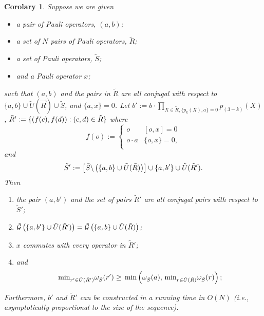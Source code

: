 \documentclass[twocolumn,showpacs,preprintnumbers,amsmath,amssymb,nofootinbib,pra,floatfix]{revtex4-1}
\newtheorem{corolary}{Corolary}
\newcommand{\lst}{\vec}
\newcommand{\set}{\tilde}
\newcommand{\genfun}{\tilde{\mathcal{G}}}
\begin{document}
\begin{corolary}
\label{recombination-to-make-commute}
Suppose we are given
\begin{itemize}
\item a pair of Pauli operators, $(a,b)$;
\item a set of $N$ pairs of Pauli operators, $\set R$;
\item a set of Pauli operators, $\set S$;
\item and a Pauli operator $x$;
\end{itemize}
such that $(a,b)$ and the pairs in $\set R$ are all conjugal with respect to $\{a,b\}\cup\set U(\lst R)\cup\set S$, and $\{a,x\}=0$.  Let $b' := b\cdot \prod_{X\in\set R, \{p_k(X),a\}=0} p_{(3-k)}(X)$, $\set R':=\{\paren{f(c),f(d)}: (c,d)\in\set R\}$ where
$$
f(o) :=
\begin{cases}
o & [o,x]=0 \\
o\cdot a & \{o,x\}=0, \\
\end{cases}
$$
and
$$\set S' := \left[\set S\backslash\paren{\{a,b\} \cup \set U(\set R)}\right]\cup \{a,b'\} \cup \set U(\set R').$$
Then
\begin{enumerate}
\item the pair $(a,b')$ and the set of pairs $\set R'$ are all conjugal pairs with respect to $\set S'$;
\item $\genfun\paren{\{a,b'\}\cup \set U(\set R')}=\genfun\paren{\{a,b\}\cup \set U(\set R)}$;
\item $x$ commutes with every operator in $\set R'$;
\item and $$\min_{r'\in \set U(\set R')}\om_{\set S}(r')\ge \min\paren{\om_{\set S}(a),\min_{r\in \set U(\set R)}\om_{\set S}(r)};$$
\end{enumerate}
Furthermore, $b'$ and $\set R'$ can be constructed in a running time in $O(N)$ (i.e., asymptotically proportional to the size of the sequence).
\end{corolary}
\end{document}
